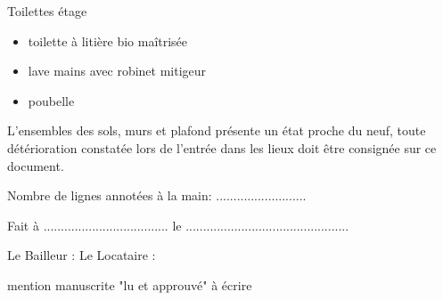 \documentclass[a4paper,11pt]{article}
\begin{document}
\vspace{0.5cm}

Toilettes étage
\begin{itemize}
\item toilette à litière bio maîtrisée
\item lave mains avec robinet mitigeur
\item poubelle
\end{itemize}

\vspace{0.25cm}

L'ensembles des sols, murs et plafond présente un état proche du neuf, toute détérioration constatée lors de l'entrée dans les lieux doit être consignée sur ce document.

\vspace{0.25cm}

Nombre de lignes annotées à la main: ..........................

\vspace{0.25cm}

Fait à .................................... le ...............................................

\vspace{0.25cm}

Le Bailleur : \hspace{3cm}Le Locataire : 

\hspace{5.2cm}mention manuscrite "lu et approuvé" à écrire


\newpage{}
\end{document}
